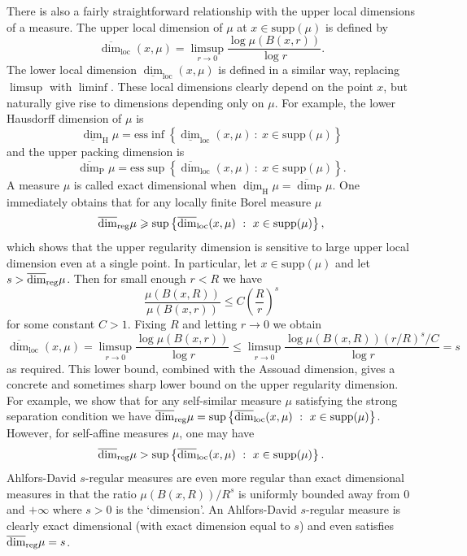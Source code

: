 \documentclass[12pt]{amsart}
\numberwithin{equation}{section}
\renewcommand{\geq}{\geqslant}
\renewcommand{\leq}{\leqslant}
\renewcommand{\H}{\text{H}}
\renewcommand{\P}{\text{P}}
\renewcommand{\r}{\overline{\dim}_{\textup{reg}} \mu}
\begin{document}
There is also a fairly straightforward relationship with the upper local dimensions of a measure. The upper local dimension of $\mu$ at $x \in \text{supp}(\mu)$ is defined by
\[
\overline{\dim}_{\text{loc}}(x,\mu)=\limsup_{r\rightarrow 0} \frac{\log \mu(B(x,r))}{\log r}.
\]
The lower local dimension $\underline{\dim}_{\text{loc}}(x,\mu)$ is defined in a similar way, replacing $\limsup$ with $\liminf$.  These local dimensions clearly depend on the point $x$, but naturally give rise to dimensions depending only on $\mu$.  For example, the lower Hausdorff dimension of $\mu$ is
\[
\underline{\dim}_\H \mu=\text{ess}  \inf \left\{  \underline{\dim}_{\text{loc}}(x,\mu)  \ : \  x\in \text{supp}(\mu) \right\} 
\]
and the upper packing dimension is
\[
\overline{\dim}_\P \mu=\text{ess}  \sup \left\{ \overline{\dim}_{\text{loc}}(x,\mu) \ : \  x\in \text{supp}(\mu) \right\}.
\]
A measure $\mu$ is called exact dimensional when $\underline{\dim}_\H \mu=\overline{\dim}_\P \mu$.   One immediately obtains that for any locally finite Borel measure $\mu$
\[
 \r \geq \sup \left\{ \overline{\dim}_{\text{loc}}(x,\mu) \ : \  x\in \text{supp}(\mu) \right\},
\]
which shows that the upper regularity dimension is sensitive to large upper local dimension even at a single point.  In particular, let $x \in \text{supp}(\mu)$ and let $s > \r$.  Then for small enough $r < R$ we have
\[
\frac{\mu(B(x,R))}{\mu(B(x,r))} \leq C\left(\frac{R}{r}\right)^{s}
\]
for some constant $C>1$.  Fixing $R$ and letting $r \to 0$ we obtain
\[
\overline{\dim}_{\text{loc}}(x,\mu)=\limsup_{r\rightarrow 0} \frac{\log \mu(B(x,r))}{\log r} \leq  \limsup_{r\rightarrow 0} \frac{\log \mu(B(x,R)) (r/R)^s/C }{\log r}  = s
\]
as required.  This lower bound, combined with the Assouad dimension, gives a concrete and sometimes sharp lower bound on the upper regularity dimension.   For example, we show that for any self-similar measure $\mu$ satisfying the strong separation condition we have $ \r = \sup \left\{ \overline{\dim}_{\text{loc}}(x,\mu) \ : \  x\in \text{supp}(\mu) \right\}$.  However, for self-affine measures $\mu$, one may have
\[
\r >  \sup \left\{ \overline{\dim}_{\text{loc}}(x,\mu) \ : \  x\in \text{supp}(\mu) \right\}.
\]
Ahlfors-David $s$-regular measures are even more regular than exact dimensional measures in that the ratio $\mu(B(x,R))/R^s$ is uniformly bounded away from 0 and $+\infty$ where $s >0$ is the `dimension'.  An Ahlfors-David $s$-regular measure is clearly exact dimensional (with exact dimension equal to $s$) and even satisfies $\r = s$.  
\end{document}
